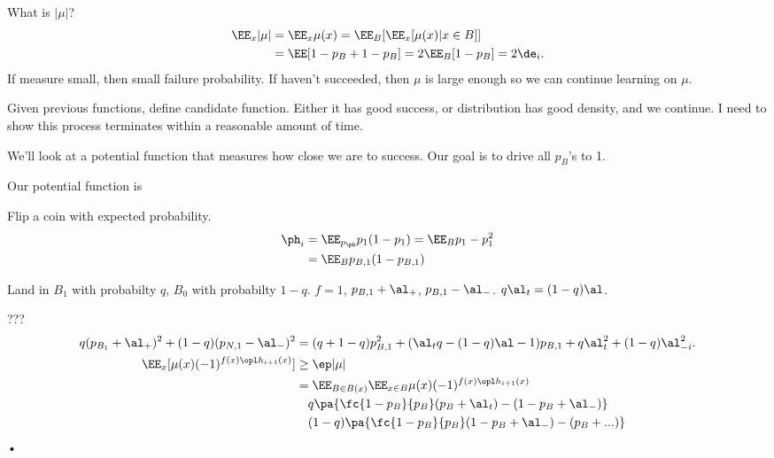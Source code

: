 What is $|\mu|$?
\begin{align}
\EE_x |\mu| &= \EE_x \mu(x) = \EE_B[\EE_x[\mu(x) | x\in B]]\\
& = \EE[1-p_B + 1-p_B] = 2\EE_B [1-p_B] = 2\de_i.
\end{align}
If measure small, then small failure probability.
If haven't succeeded, then $\mu$ is large enough so we can continue learning on $\mu$.

Given previous functions, define candidate function. Either it has good success, or distribution has good density, and we continue. I need to show this process terminates within a reasonable amount of time.

We'll look at a potential function that measures how close we are to success. Our goal is to drive all $p_B$'s to 1. %


Our potential function is 


Flip a coin with expected probability. 
\begin{align}
\ph_i& = \EE_{p_\ph} p_1(1-p_1)  = \EE_B p_1 - p_1^2\\
&=
\EE_B p_{B,1} (1-p_{B,1})
\end{align}

Land in $B_1$ with probabilty $q$, $B_0$ with probabilty $1-q$. 
$f=1$, $p_{B,1}+\al_+$,  $p_{B,1} - \al_-$. $q\al_t  = (1-q)\al$. 

???
\begin{align}
q(p_{B_1}+\al_+)^2 + (1-q) (p_{N,1}-\al_-)^2 &= (q+1-q) p_{B,1}^2 + (\al_t q - (1-q) \al - 1) p_{B,1} + q\al_t^2 + (1-q) \al_{-i}^2.\\
\EE_x [\mu(x) (-1)^{f(x)\opl h_{i+1}(x)}] &\ge \ep|\mu|\\
& = \EE_{ B\in B(x)}  \EE_{x\in B} \mu(x) (-1)^{f(x)\opl h_{i+1}(x)}\\
&\quad q\pa{\fc{1-p_B}{p_B} (p_B + \al_t) - (1-p_B+\al_-)} \\
&\quad (1-q)\pa{\fc{1-p_B}{p_B} (1 - p_B + \al_-) - (p_B+...)}
\end{align}•

